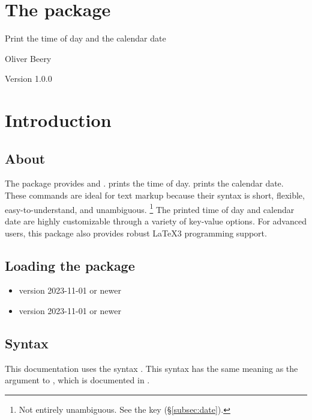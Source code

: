 \documentclass{beerydoc}
\begin{document}
\section*{\LARGE The  package}

Print the time of day and the calendar date

Oliver Beery

Version 1.0.0\quad\date{2026-11-22}

\tableofcontents
\pagebreak


\section{Introduction}
\label{sec:intro}

\subsection{About}
\label{subsec:about}

The  package provides  and .
 prints the time of day.
 prints the calendar date.
These commands are ideal for text markup because their syntax is short,
flexible, easy-to-understand, and unambiguous.%
\footnote
  {%
    Not entirely unambiguous.
    See the key  (\S\ref{subsec:date}).%
  }
The printed time of day and calendar date are highly customizable through a
variety of key-value options.
For advanced users, this package also provides robust \LaTeX3 programming
support.

\subsection{Loading the package}
\label{subsec:load}

\begin{itemize}
  \item \LaTeXe{} version 2023-11-01 or newer
  \item {} version 2023-11-01 or newer
\end{itemize}

\subsection{Syntax}
\label{subsec:syntax}

This documentation uses the syntax .
This syntax has the same meaning as the argument to , which is
documented in .
\end{document}
